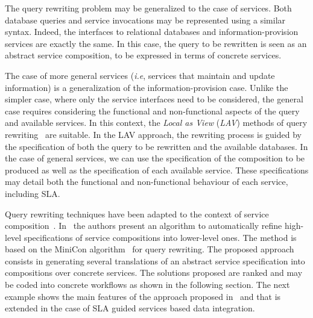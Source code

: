 The query rewriting problem may be generalized to the case of services.
Both database queries and service invocations may be represented using a similar syntax.
Indeed, the interfaces to relational databases and information-provision
services are exactly the same.
In this case, the query to be rewritten is seen as an abstract service composition, to be expressed in terms of concrete services.

The case of more general services (\textit{i.e}, services that maintain and update information) is a generalization of the information-provision case.
Unlike the simpler case, where only the service interfaces need to be considered, the general case requires considering the functional and non-functional aspects of the query and available services.
In this context, the \textit{Local as View} (\textit{LAV}) methods of query rewriting~\cite{Levy2000} are suitable.
In the LAV approach, the rewriting process is guided by the specification of both the query to be rewritten and the available databases.
In the case of general services, we can use the specification of the composition to be produced as well as the specification of each available service.
These specifications may detail both the functional and non-functional behaviour of each service, including SLA.

Query rewriting techniques have been adapted to the context of service composition~\cite{BBM10,ZLC11,CostaAMR13}. 
In~\cite{CostaAMR13} the authors present an algorithm to automatically refine high-level specifications of service compositions into lower-level ones. 
The method is based on the MiniCon algorithm~\cite{PH01} for query rewriting.
The proposed approach consists in generating several translations of an abstract service specification into compositions
over concrete  services. 
The solutions proposed are ranked and may be coded into concrete workflows as shown in the following section.  The next example shows the main features of the approach proposed in~\cite{CostaAMR13} and that is extended in the case of SLA guided services based data integration. 

